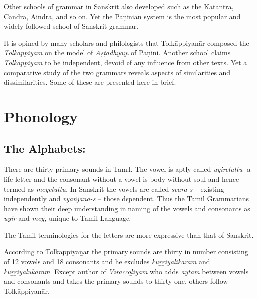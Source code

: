 Other schools of grammar in Sanskrit also developed such as the Kātantra, Cāndra, Aindra, and so on. Yet the Pāṇinian system is the most popular and widely followed school of Sanskrit grammar.

It is opined by many scholars and philologists that Tolkāppiyaṉār composed the \textit{Tolkāppiyam} on the model of \textit{Aṣṭādhyāyī} of Pāṇini. Another school claims \textit{Tolkāppiyam} to be independent, devoid of any influence from other texts. Yet a comparative study of the two grammars reveals aspects of similarities and dissimilarities. Some of these are presented here in brief.


\section*{Phonology}

\subsection*{The Alphabets:}

There are thirty primary sounds in Tamil. The vowel is aptly called \textit{uyireḻuttu}- a life letter and the consonant without a vowel is body without soul and hence termed as \textit{meyeḻuttu.} In Sanskrit the vowels are called \textit{svara-s} – existing independently and \textit{vyañjana-s} – those dependent. Thus the Tamil Grammarians have shown their deep understanding in naming of the vowels and consonants as \textit{uyir} and \textit{mey,} unique to Tamil Language.

The Tamil terminologies for the letters are more expressive than that of Sanskrit.

According to Tolkāppiyaṉār the primary sounds are thirty in number consisting of 12 vowels and 18 consonants and he excludes \textit{kuṟṟiyalikaram} and\textit{ kuṟṟiyalukaram}. Except author of \textit{Vīraccoḻiyam} who adds \textit{āytam} between vowels and consonants and takes the primary sounds to thirty one, others follow Tolkāppiyaṉār.

